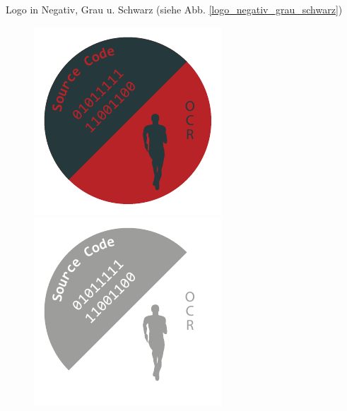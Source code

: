Logo in Negativ, Grau u. Schwarz (siehe Abb. \ref{logo_negativ_grau_schwarz})
\begin{figure}[H]
	\centering
	\begin{minipage}[b]{0.40\textwidth}
		\includegraphics[width=\textwidth]{content/bsp/Logo-negativ.pdf}
	\end{minipage}
	\hfill
	\begin{minipage}[b]{0.30\textwidth}
		\includegraphics[width=\textwidth]{content/bsp/Logo-Grau.pdf}

\end{minipage}
\end{figure}
